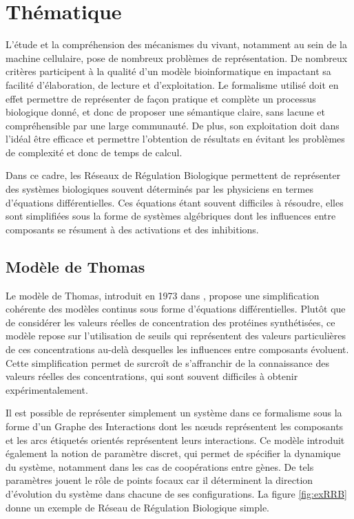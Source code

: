 
\chapter{Thématique}

L'étude et la compréhension des mécanismes du vivant, notamment au sein de la machine cellulaire, pose de nombreux problèmes de représentation.
De nombreux critères participent à la qualité d'un modèle bioinformatique en impactant sa facilité d'élaboration, de lecture et d'exploitation.
Le formalisme utilisé doit en effet permettre de représenter de façon pratique et complète un processus biologique donné, et donc
de proposer une sémantique claire, sans lacune et compréhensible par une large communauté.
De plus, son exploitation doit dans l'idéal être efficace et permettre l'obtention de résultats en évitant les problèmes de complexité et donc de temps de calcul.

Dans ce cadre, les Réseaux de Régulation Biologique permettent de représenter des systèmes biologiques souvent déterminés par les physiciens en termes d'équations différentielles.
Ces équations étant souvent difficiles à résoudre, elles sont simplifiées sous la forme de systèmes algébriques dont les influences entre composants se résument à des activations et des inhibitions.

\section{Modèle de Thomas}
Le modèle de Thomas, introduit en 1973 dans \cite{Thomas73}, propose une simplification cohérente des modèles continus sous forme d'équations différentielles.
Plutôt que de considérer les valeurs réelles de concentration des protéines synthétisées, ce modèle repose sur l'utilisation de seuils qui représentent des valeurs particulières de ces concentrations au-delà desquelles les influences entre composants évoluent.
Cette simplification permet de surcroît de s'affranchir de la connaissance des valeurs réelles des concentrations, qui sont souvent difficiles à obtenir expérimentalement.

Il est possible de représenter simplement un système dans ce formalisme sous la forme d'un Graphe des Interactions dont les nœuds représentent les composants et les arcs étiquetés orientés représentent leurs interactions.
Ce modèle introduit également la notion de paramètre discret, qui permet de spécifier la dynamique du système, notamment dans les cas de coopérations entre gènes.
De tels paramètres jouent le rôle de points focaux car il déterminent la direction d'évolution du système dans chacune de ses configurations.
La figure \ref{fig:exRRB} donne un exemple de Réseau de Régulation Biologique simple.

